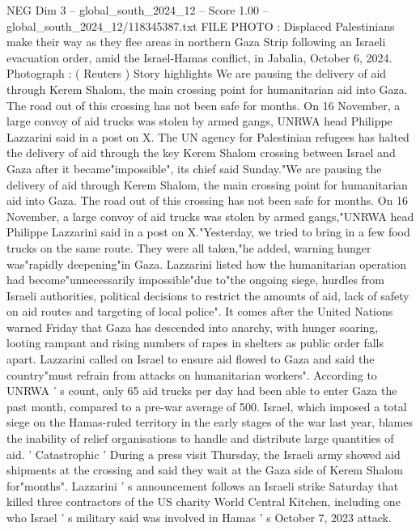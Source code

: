 \begin{textsample}{NEG Dim 3 – global\_south\_2024\_12 – Score 1.00 – global\_south\_2024\_12/118345387.txt}  \label{ex:f3_neg_068}
FILE PHOTO : Displaced Palestinians make their way as they flee areas in northern Gaza Strip following an Israeli evacuation order, amid the Israel-Hamas conflict, in Jabalia, October 6, 2024.
Photograph : ( Reuters ) Story highlights We are pausing the delivery of aid through Kerem Shalom, the main crossing point for humanitarian aid into Gaza.
The road out of this crossing has not been safe for months.
On 16 November, a large convoy of aid trucks was stolen by armed gangs, UNRWA head Philippe Lazzarini said in a post on X.
The UN agency for Palestinian refugees has halted the delivery of aid through the key Kerem Shalom crossing between Israel and Gaza after it became"impossible", its chief said Sunday."We are pausing the delivery of aid through Kerem Shalom, the main crossing point for humanitarian aid into Gaza.
The road out of this crossing has not been safe for months.
On 16 November, a large convoy of aid trucks was stolen by armed gangs,"UNRWA head Philippe Lazzarini said in a post on X."Yesterday, we tried to bring in a few food trucks on the same route.
They were all taken,"he added, warning hunger was"rapidly deepening"in Gaza.
Lazzarini listed how the humanitarian operation had become"unnecessarily impossible"due to"the ongoing siege, hurdles from Israeli authorities, political decisions to restrict the amounts of aid, lack of safety on aid routes and targeting of local police".
It comes after the United Nations warned Friday that Gaza has descended into anarchy, with hunger soaring, looting rampant and rising numbers of rapes in shelters as public order falls apart.
Lazzarini called on Israel to ensure aid flowed to Gaza and said the country"must refrain from attacks on humanitarian workers".
According to UNRWA ' s count, only 65 aid trucks per day had been able to enter Gaza the past month, compared to a pre-war average of 500.
Israel, which imposed a total siege on the Hamas-ruled territory in the early stages of the war last year, blames the inability of relief organisations to handle and distribute large quantities of aid. ' Catastrophic ' During a press visit Thursday, the Israeli army showed aid shipments at the crossing and said they wait at the Gaza side of Kerem Shalom for"months".
Lazzarini ' s announcement follows an Israeli strike Saturday that killed three contractors of the US charity World Central Kitchen, including one who Israel ' s military said was involved in Hamas ' s October 7, 2023 attack.

\end{textsample}
